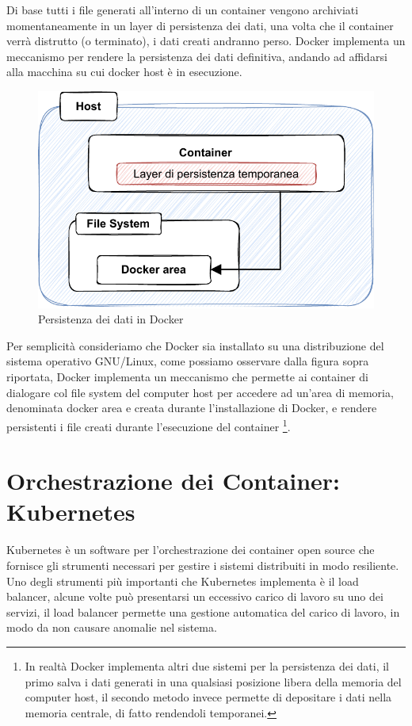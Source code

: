 Di base tutti i file generati all'interno di un container vengono archiviati momentaneamente in un layer di persistenza dei dati, una volta che il container verrà distrutto (o terminato), i dati creati andranno perso. Docker implementa un meccanismo per rendere la persistenza dei dati definitiva, andando ad affidarsi alla macchina su cui docker host è in esecuzione. 

\begin{figure}[h]
    \centering
    \includegraphics[scale=0.65]{capitoli/immagini/09_docker_volume.pdf}
    \caption{Persistenza dei dati in Docker}
    \label{fig:docker_persistance}
\end{figure}

Per semplicità consideriamo che Docker sia installato su una distribuzione del sistema operativo GNU/Linux, come possiamo osservare dalla figura sopra riportata, Docker implementa un meccanismo che permette ai container di dialogare col file system del computer host per accedere ad un'area di memoria, denominata docker area e creata durante l'installazione di Docker, e rendere persistenti i file creati durante l'esecuzione del container \footnote{In realtà Docker implementa altri due sistemi per la persistenza dei dati, il primo salva i dati generati in una qualsiasi posizione libera della memoria del computer host, il secondo metodo invece permette di depositare i dati nella memoria centrale, di fatto rendendoli temporanei.}. 

\section{Orchestrazione dei Container: Kubernetes}
Kubernetes \cite{K8S} è un software per l'orchestrazione dei container open source che  fornisce gli strumenti necessari per gestire i sistemi distribuiti in modo resiliente. Uno degli strumenti più importanti che Kubernetes implementa è il load balancer, alcune volte può presentarsi un eccessivo carico di lavoro su uno dei servizi, il load balancer permette una gestione automatica del carico di lavoro, in modo da non causare anomalie nel sistema.

